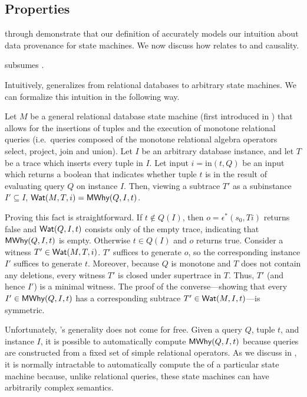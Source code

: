 \subsection{\WatProvenance{} Properties}
 through  demonstrate
that our definition of \watprovenance{} accurately models our intuition about
data provenance for state machines. We now discuss how \watprovenance{} relates
to \whyprovenance{} and causality.

\begin{claim}
  \Watprovenance{} subsumes \whyprovenance{}.
\end{claim}

\newcommand{\Min}{\text{in}}
Intuitively, \watprovenance{} generalizes \whyprovenance{} from relational
databases to arbitrary state machines. We can formalize this intuition in the
following way.

Let $M$ be a general relational database state machine (first introduced in
) that allows for the insertions of tuples and
the execution of monotone relational queries (i.e.\ queries composed of the
monotone relational algebra operators select, project, join and union). Let
$I$ be an arbitrary database instance, and let $T$ be a trace which inserts
every tuple in $I$. Let input $i = \Min(t, Q)$ be an input which returns a
boolean that indicates whether tuple $t$ is in the result of evaluating query
$Q$ on instance $I$. Then, viewing a subtrace $T'$ as a subinstance $I'
\subseteq I$, $\textsf{Wat}(M, T, i) = \textsf{MWhy}(Q, I, t)$.

Proving this fact is straightforward.
%
If $t \notin Q(I)$, then $o = \epsilon^*(s_0, Ti)$ returns false and $\textsf{Wat}(Q,
I, t)$ consists only of the empty trace, indicating that $\textsf{MWhy}(Q, I, t)$ is
empty.
%
Otherwise $t \in Q(I)$ and $o$ returns true. Consider a witness $T' \in \textsf{Wat}(M,
T, i)$. $T'$ suffices to generate $o$, so the corresponding instance $I'$
suffices to generate $t$. Moreover, because $Q$ is monotone and $T$ does not
contain any deletions, every witness $T'$ is closed under supertrace in $T$.
Thus, $T'$ (and hence $I'$) is a minimal witness. The proof of the
converse---showing that every $I' \in \textsf{MWhy}(Q, I, t)$ has a corresponding
subtrace $T' \in \textsf{Wat}(M, I, t)$---is symmetric.

Unfortunately, \watprovenance{}'s generality does not come for free. Given a
query $Q$, tuple $t$, and instance $I$, it is possible to automatically compute
$\textsf{MWhy}(Q, I, t)$ because queries are constructed from a fixed set of simple
relational operators. As we discuss in , it is normally
intractable to automatically compute the \watprovenance{} of a particular state
machine because, unlike relational queries, these state machines can have
arbitrarily complex semantics.

